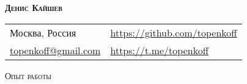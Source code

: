 \documentclass[a4paper]{article}
\newcommand{\lineunder} {
    \vspace*{-8pt} \\
    \hspace*{-18pt} \hrulefill \\
}
\newcommand{\header} [1] {
    {\hspace*{-18pt}\vspace*{6pt} \textsc{#1}}
    \vspace*{-6pt} \lineunder
}
\begin{document}
\vspace*{-40pt}

\vspace*{-10pt}
\begin{center}
    \textbf{{\huge \scshape {Денис Кайшев}}}\\
    \vspace*{10pt}
    \begin{tabular}{l l}
        Москва, Россия & \url{https://github.com/topenkoff} \\
        \href{mailto:topenkoff@gmail.com}{topenkoff@gmail.com} & \url{https://t.me/topenkoff} \\
    \end{tabular}
    \vspace*{15pt}
\end{center}

\header{Опыт работы}
\vspace{1mm}

\end{document}
